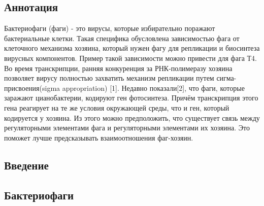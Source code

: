 \documentclass[14pt]{extarticle}
\begin{document}
%


\newpage
\tableofcontents

\newpage
\begin{center}
\item \section{Аннотация}
\end{center}

\par{Бактериофаги (фаги) - это вирусы, которые избирательно поражают бактериальные клетки. Такая специфика обусловлена
зависимостью фага от клеточного механизма хозяина, который нужен фагу для репликации и биосинтеза вирусных компонентов.
Пример такой зависимости  можно привести для фага Т4. Во время транскрипции, ранняя конкуренция за РНК-полимеразу
хозяина позволяет вирусу полностью захватить механизм репликации путем сигма-присвоения(sigma appropriation) [1].
Недавно показали[2], что фаги, которые заражают цианобактерии, кодируют ген фотосинтеза. Причём транскрипция этого гена
реагирует на те же условия окружающей среды, что и ген, который кодируется у хозяина. Из этого можно предположить, что
существует связь между регуляторными элементами фага и регуляторными элементами их хозяина. Это поможет лучше
предсказывать взаимоотношения фаг-хозяин.}



\newpage
\begin{center}
\item \section{Введение}
\end{center}

    \begin{center}
    \item \subsection{Бактериофаги}
    \end{center}
    
\end{document}
